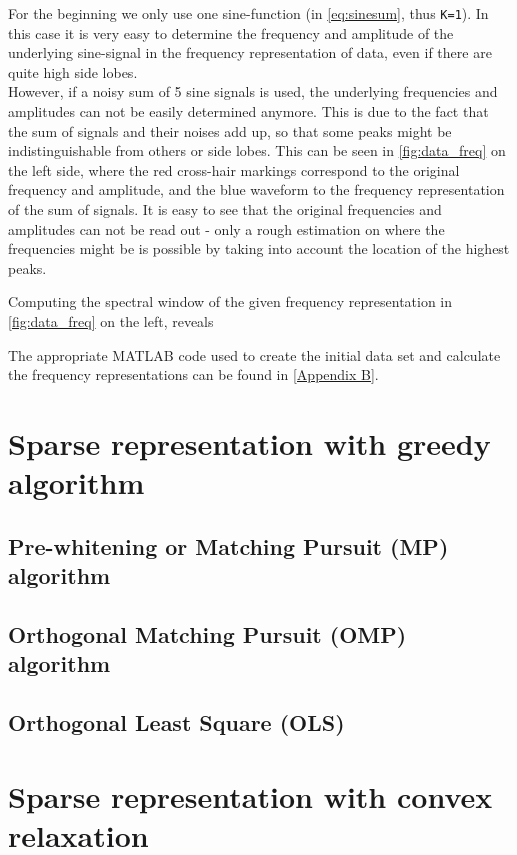 For the beginning we only use one sine-function (in \cref{eq:sinesum}, thus \texttt{K=1}). In this case it is very easy to determine the frequency and amplitude of the underlying sine-signal in the frequency representation of data, even if there are quite high side lobes. \\
However, if a noisy sum of 5 sine signals is used, the underlying frequencies and amplitudes can not be easily determined anymore. This is due to the fact that the sum of signals and their noises add up, so that some peaks might be indistinguishable from others or side lobes. This can be seen in \cref{fig:data_freq} on the left side, where the red cross-hair markings correspond to the original frequency and amplitude, and the blue waveform to the frequency representation of the sum of signals. It is easy to see that the original frequencies and amplitudes can not be read out - only a rough estimation on where the frequencies might be is possible by taking into account the location of the highest peaks.

Computing the spectral window of the given frequency representation in \cref{fig:data_freq} on the left, reveals

The appropriate MATLAB code used to create the initial data set and calculate the frequency representations can be found in \cref{Appendix B}.


\section{Sparse representation with greedy algorithm}

\subsection{Pre-whitening or Matching Pursuit (MP) algorithm}




\subsection{Orthogonal Matching Pursuit (OMP) algorithm}



\subsection{Orthogonal Least Square (OLS)}




\section{Sparse representation with convex relaxation}

